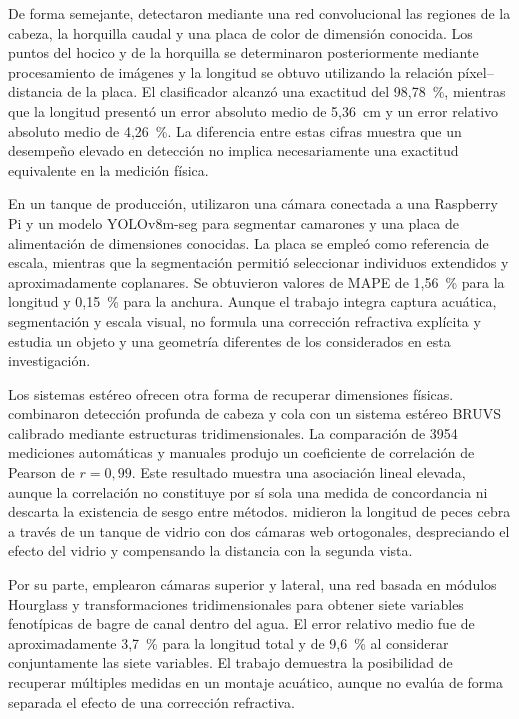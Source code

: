 \documentclass{report}
\begin{document}
De forma semejante, \textcite{Tseng2020} detectaron mediante una red convolucional las regiones de la cabeza, la horquilla caudal y una placa de color de dimensión conocida. Los puntos del hocico y de la horquilla se determinaron posteriormente mediante procesamiento de imágenes y la longitud se obtuvo utilizando la relación píxel--distancia de la placa. El clasificador alcanzó una exactitud del 98,78~\%, mientras que la longitud presentó un error absoluto medio de 5,36~cm y un error relativo absoluto medio de 4,26~\%. La diferencia entre estas cifras muestra que un desempeño elevado en detección no implica necesariamente una exactitud equivalente en la medición física.

En un tanque de producción, \textcite{Correia2025} utilizaron una cámara conectada a una Raspberry Pi y un modelo YOLOv8m-seg para segmentar camarones y una placa de alimentación de dimensiones conocidas. La placa se empleó como referencia de escala, mientras que la segmentación permitió seleccionar individuos extendidos y aproximadamente coplanares. Se obtuvieron valores de MAPE de 1,56~\% para la longitud y 0,15~\% para la anchura. Aunque el trabajo integra captura acuática, segmentación y escala visual, no formula una corrección refractiva explícita y estudia un objeto y una geometría diferentes de los considerados en esta investigación.

Los sistemas estéreo ofrecen otra forma de recuperar dimensiones físicas. \textcite{Marrable2023} combinaron detección profunda de cabeza y cola con un sistema estéreo BRUVS calibrado mediante estructuras tridimensionales. La comparación de 3954 mediciones automáticas y manuales produjo un coeficiente de correlación de Pearson de $r = 0{,}99$. Este resultado muestra una asociación lineal elevada, aunque la correlación no constituye por sí sola una medida de concordancia ni descarta la existencia de sesgo entre métodos. \textcite{AlJubouri2017} midieron la longitud de peces cebra a través de un tanque de vidrio con dos cámaras web ortogonales, despreciando el efecto del vidrio y compensando la distancia con la segunda vista.

Por su parte, \textcite{ZhangX2025} emplearon cámaras superior y lateral, una red basada en módulos Hourglass y transformaciones tridimensionales para obtener siete variables fenotípicas de bagre de canal dentro del agua. El error relativo medio fue de aproximadamente 3,7~\% para la longitud total y de 9,6~\% al considerar conjuntamente las siete variables. El trabajo demuestra la posibilidad de recuperar múltiples medidas en un montaje acuático, aunque no evalúa de forma separada el efecto de una corrección refractiva.
\end{document}

